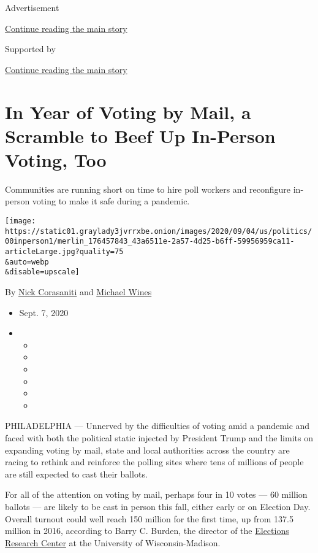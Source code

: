 Advertisement

\protect\hyperlink{after-top}{Continue reading the main story}

Supported by

\protect\hyperlink{after-sponsor}{Continue reading the main story}

\hypertarget{in-year-of-voting-by-mail-a-scramble-to-beef-up-in-person-voting-too}{%
\section{In Year of Voting by Mail, a Scramble to Beef Up In-Person
Voting,
Too}\label{in-year-of-voting-by-mail-a-scramble-to-beef-up-in-person-voting-too}}

Communities are running short on time to hire poll workers and
reconfigure in-person voting to make it safe during a pandemic.

\texttt{[image: https://static01.graylady3jvrrxbe.onion/images/2020/09/04/us/politics/00inperson1/merlin\_176457843\_43a6511e-2a57-4d25-b6ff-59956959ca11-articleLarge.jpg?quality=75\\\&auto=webp\\\&disable=upscale]}

By \href{https://www.nytimes3xbfgragh.onion/by/nick-corasaniti}{Nick
Corasaniti} and
\href{https://www.nytimes3xbfgragh.onion/by/michael-wines}{Michael
Wines}

\begin{itemize}
\item
  Sept. 7, 2020
\item
  \begin{itemize}
  \item
  \item
  \item
  \item
  \item
  \item
  \end{itemize}
\end{itemize}

PHILADELPHIA --- Unnerved by the difficulties of voting amid a pandemic
and faced with both the political static injected by President Trump and
the limits on expanding voting by mail, state and local authorities
across the country are racing to rethink and reinforce the polling sites
where tens of millions of people are still expected to cast their
ballots.

For all of the attention on voting by mail, perhaps four in 10 votes ---
60 million ballots --- are likely to be cast in person this fall, either
early or on Election Day. Overall turnout could well reach 150 million
for the first time, up from 137.5 million in 2016, according to Barry C.
Burden, the director of the
\href{https://www.elections.wisc.edu}{Elections Research Center} at the
University of Wisconsin-Madison.

